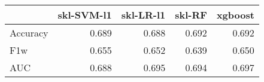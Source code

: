 \begin{tabular}{lrrrr}
\toprule
{} &  skl-SVM-l1 &  skl-LR-l1 &  skl-RF &  xgboost \\
\midrule
Accuracy &       0.689 &      0.688 &   0.692 &    0.692 \\
F1w      &       0.655 &      0.652 &   0.639 &    0.650 \\
AUC      &       0.688 &      0.695 &   0.694 &    0.697 \\
\bottomrule
\end{tabular}
